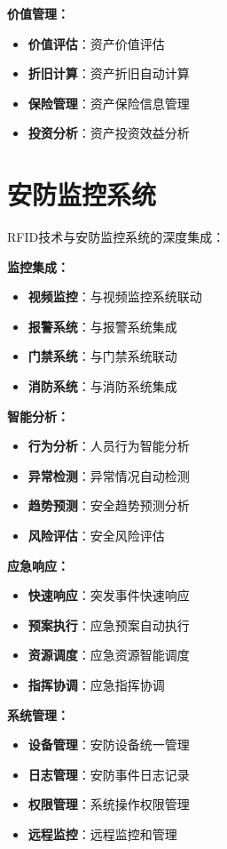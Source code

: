 \documentclass[12pt,UTF8]{ctexbook}
\begin{document}
\begin{itemize}[leftmargin=3.5em]
\begin{itemize}[leftmargin=3.5em]
\begin{itemize}[leftmargin=3.5em]
\begin{itemize}[leftmargin=3.5em]
\textbf{价值管理：}
\begin{itemize}[leftmargin=3.5em]
    \item \textbf{价值评估}：资产价值评估
    \item \textbf{折旧计算}：资产折旧自动计算
    \item \textbf{保险管理}：资产保险信息管理
    \item \textbf{投资分析}：资产投资效益分析
\end{itemize}

\section{安防监控系统}

RFID技术与安防监控系统的深度集成：

\textbf{监控集成：}
\begin{itemize}[leftmargin=3.5em]
    \item \textbf{视频监控}：与视频监控系统联动
    \item \textbf{报警系统}：与报警系统集成
    \item \textbf{门禁系统}：与门禁系统联动
    \item \textbf{消防系统}：与消防系统集成
\end{itemize}

\textbf{智能分析：}
\begin{itemize}[leftmargin=3.5em]
    \item \textbf{行为分析}：人员行为智能分析
    \item \textbf{异常检测}：异常情况自动检测
    \item \textbf{趋势预测}：安全趋势预测分析
    \item \textbf{风险评估}：安全风险评估
\end{itemize}

\textbf{应急响应：}
\begin{itemize}[leftmargin=3.5em]
    \item \textbf{快速响应}：突发事件快速响应
    \item \textbf{预案执行}：应急预案自动执行
    \item \textbf{资源调度}：应急资源智能调度
    \item \textbf{指挥协调}：应急指挥协调
\end{itemize}

\textbf{系统管理：}
\begin{itemize}[leftmargin=3.5em]
    \item \textbf{设备管理}：安防设备统一管理
    \item \textbf{日志管理}：安防事件日志记录
    \item \textbf{权限管理}：系统操作权限管理
    \item \textbf{远程监控}：远程监控和管理
\end{itemize}


\end{itemize}
\end{itemize}
\end{itemize}
\end{itemize}
\end{document}
